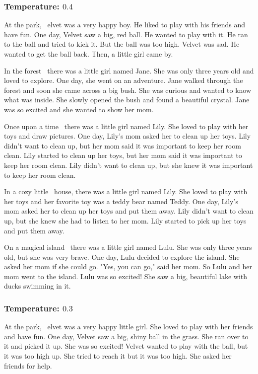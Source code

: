 \documentclass[11pt]{article}
\begin{document}
    \subsubsection*{Temperature: $0.4$}

    At the park, \textellipsis\ elvet was a very happy boy. He liked to play with his friends and have fun. One day, Velvet saw a big, red ball. He wanted to play with it. He ran to the ball and tried to kick it. But the ball was too high. Velvet was sad. He wanted to get the ball back. Then, a little girl came by.

    In the forest \textellipsis\ there was a little girl named Jane. She was only three years old and loved to explore. One day, she went on an adventure. Jane walked through the forest and soon she came across a big bush. She was curious and wanted to know what was inside. She slowly opened the bush and found a beautiful crystal. Jane was so excited and she wanted to show her mom.

    Once upon a time \textellipsis\ there was a little girl named Lily. She loved to play with her toys and draw pictures. One day, Lily's mom asked her to clean up her toys. Lily didn't want to clean up, but her mom said it was important to keep her room clean. Lily started to clean up her toys, but her mom said it was important to keep her room clean. Lily didn't want to clean up, but she knew it was important to keep her room clean.

    In a cozy little \textellipsis\ house, there was a little girl named Lily. She loved to play with her toys and her favorite toy was a teddy bear named Teddy. One day, Lily's mom asked her to clean up her toys and put them away. Lily didn't want to clean up, but she knew she had to listen to her mom. Lily started to pick up her toys and put them away.

    On a magical island \textellipsis\ there was a little girl named Lulu. She was only three years old, but she was very brave. One day, Lulu decided to explore the island. She asked her mom if she could go. "Yes, you can go," said her mom. So Lulu and her mom went to the island. Lulu was so excited! She saw a big, beautiful lake with ducks swimming in it.


    \subsubsection*{Temperature: $0.3$}

    At the park, \textellipsis\ elvet was a very happy little girl. She loved to play with her friends and have fun. One day, Velvet saw a big, shiny ball in the grass. She ran over to it and picked it up. She was so excited! Velvet wanted to play with the ball, but it was too high up. She tried to reach it but it was too high. She asked her friends for help.
\end{document}
